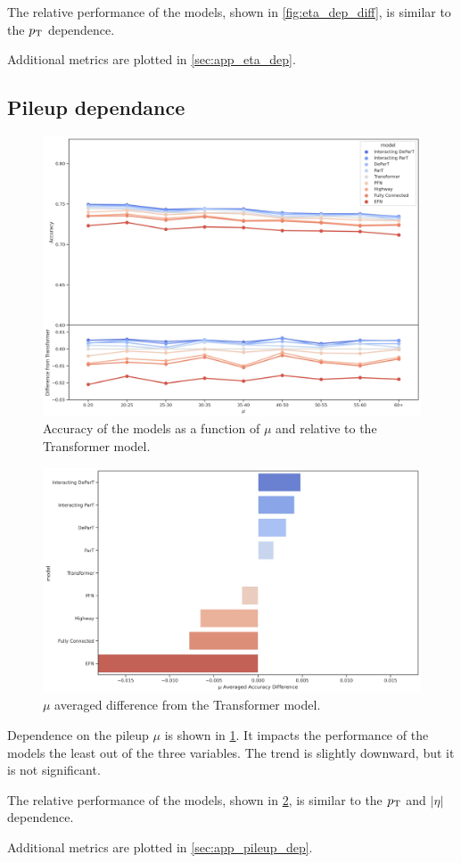 The relative performance of the models, shown in \cref{fig:eta_dep_diff}, is similar to the $p_\text{T}$ dependence.

Additional metrics are plotted in \cref{sec:app_eta_dep}.

\FloatBarrier

\subsection{Pileup dependance}
\label{sec:mu_dependance}
\begin{figure}[htb]
    \centering
    \includegraphics[width=1\linewidth]{src/plots/results/mu_dep/relative_accuracy.jpg}
    \caption{Accuracy of the models as a function of $\mu$ and relative to the Transformer model.}
    \label{fig:mu_dep_acc}
\end{figure}
\begin{figure}[htb]
    \centering
    \includegraphics[width=1\linewidth]{src/plots/results/mu_dep/relative_error.jpg}
    \caption{$\mu$ averaged difference from the Transformer model.}
    \label{fig:mu_dep_diff}
\end{figure}
Dependence on the pileup $\mu$ is shown in \cref{fig:mu_dep_acc}.
It impacts the performance of the models the least out of the three variables.
The trend is slightly downward, but it is not significant.

The relative performance of the models, shown in \cref{fig:mu_dep_diff}, is similar to the $p_\text{T}$ and $|\eta|$ dependence.

Additional metrics are plotted in \cref{sec:app_pileup_dep}.